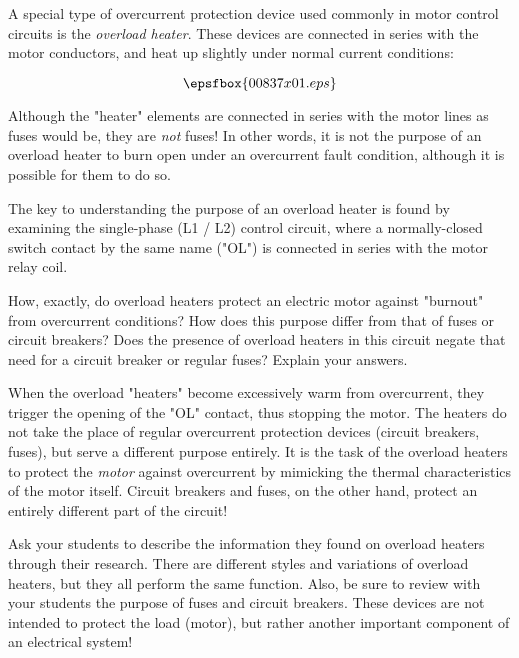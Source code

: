 

A special type of overcurrent protection device used commonly in motor control circuits is the {\it overload heater}.  These devices are connected in series with the motor conductors, and heat up slightly under normal current conditions:

$$\epsfbox{00837x01.eps}$$

Although the "heater" elements are connected in series with the motor lines as fuses would be, they are {\it not} fuses!  In other words, it is not the purpose of an overload heater to burn open under an overcurrent fault condition, although it is possible for them to do so.  

The key to understanding the purpose of an overload heater is found by examining the single-phase (L1 / L2) control circuit, where a normally-closed switch contact by the same name ("OL") is connected in series with the motor relay coil.

How, exactly, do overload heaters protect an electric motor against "burnout" from overcurrent conditions?  How does this purpose differ from that of fuses or circuit breakers?  Does the presence of overload heaters in this circuit negate that need for a circuit breaker or regular fuses?  Explain your answers.







When the overload "heaters" become excessively warm from overcurrent, they trigger the opening of the "OL" contact, thus stopping the motor.  The heaters do not take the place of regular overcurrent protection devices (circuit breakers, fuses), but serve a different purpose entirely.  It is the task of the overload heaters to protect the {\it motor} against overcurrent by mimicking the thermal characteristics of the motor itself.  Circuit breakers and fuses, on the other hand, protect an entirely different part of the circuit!







Ask your students to describe the information they found on overload heaters through their research.  There are different styles and variations of overload heaters, but they all perform the same function.  Also, be sure to review with your students the purpose of fuses and circuit breakers.  These devices are not intended to protect the load (motor), but rather another important component of an electrical system!

